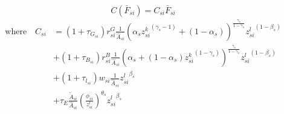 \begin{equation*}
	C(\bar{F}_{si}) = C_{si} \bar{F}_{si} 
	\end{equation*}
	\begin{equation*}
		\begin{split}
			\text{where} \quad C_{si}  &  = (1+ \tau_{G_{si}}) r^{G}_{si} \frac{1}{\hat{A}_{si}} \left(
				\alpha_s {z_{si}^k}^{(\gamma_s-1)} + (1-\alpha_s)
			\right)^{\frac{\gamma_s}{1-\gamma_s}} {z_{si}^l}^{(1-\beta_s)} \\
			& + (1+ \tau_{B_{si}})r^{B}_{si}\frac{1}{\hat{A}_{si}} \left(
				\alpha_s  + (1-\alpha_s){z^k_{si}}^{(1-\gamma_s )}
			\right)^{\frac{\gamma_s}{1-\gamma_s}} {z_{si}^l}^{(1-\beta_s)}\\
			& + (1+ \tau_{l_{si}}) w_{si} \frac{1}{\hat{A}_{si}}  {z_{si}^l}^{\beta_s}\\
			 & + \tau_{E} \frac{\tilde{A}_{si}}{\hat{A}_{si}}(\frac{\phi_{si}}{z^{l}_{si}})^{\theta_s} {z^{l}_{si}}^{\beta_s}
		\end{split}
	\end{equation*}